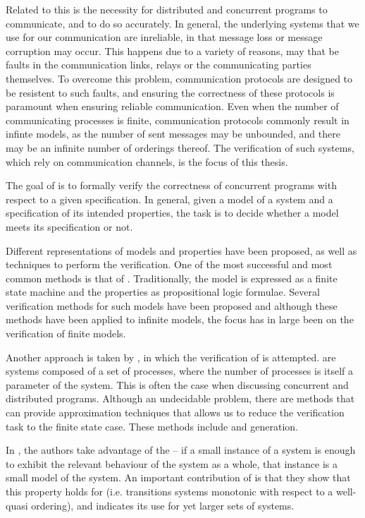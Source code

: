 Related to this is the necessity for distributed and concurrent programs to communicate, and to do so accurately. In general, the underlying systems that we use for our communication are inreliable, in that message loss or message corruption may occur. This happens due to a variety of reasons, may that be faults in the communication links, relays or the communicating parties themselves. To overcome this problem, communication protocols are designed to be resistent to such faults, and ensuring the correctness of these protocols is paramount when ensuring reliable communication. Even when the number of communicating processes is finite, communication protocols commonly result in infinte models, as the number of sent messages may be unbounded, and there may be an infinite number of orderings thereof. The verification of such systems, which rely on communication channels, is the focus of this thesis.

The goal of  is to formally verify the correctness of concurrent programs with respect  to a given specification. In general, given a model of a system and a specification of its intended properties, the task is to decide whether a model meets its specification or not.

Different representations of models and properties have been proposed, as well as techniques to perform the verification. One of the most successful and most common methods is that of . Traditionally, the model is expressed as a finite state machine and the properties as propositional logic formulae. Several verification methods for such models have been proposed\cite{mcmillan1993symbolic} and although these methods have been applied to infinite models\cite{705644}, the focus has in large been on the verification of finite models.

Another approach is taken by \cite{parosh}, in which the verification of  is attempted.  are systems composed of a set of processes, where the number of processes is itself a parameter of the system. This is often the case when discussing concurrent and distributed programs. Although an undecidable problem, there are methods that can provide approximation techniques that allows us to reduce the verification task to the finite state case. These methods include \cite{counterabstraction} and  generation\cite{invinv}. 

In \cite{parosh}, the authors take advantage of the  -- if a small instance of a system is enough to exhibit the relevant behaviour of the system as a whole, that instance is a small model of the system. An important contribution of \cite{parosh} is that they show that this property holds for \cite{abdulla2010} (i.e. transitions systems monotonic with respect to a well-quasi ordering), and indicates its use for yet larger sets of systems.

